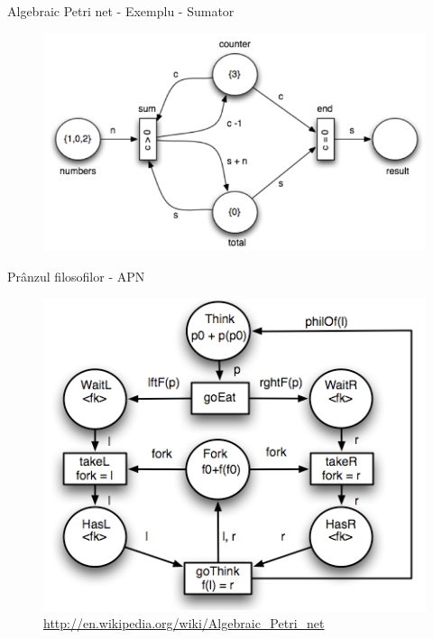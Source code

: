 \documentclass{beamer}
\begin{document}
\begin{frame}{Algebraic Petri net - Exemplu - Sumator}
\begin{figure}
\includegraphics[scale=0.7]{images/sum}
\caption{\label{fig:sum}}
\end{figure}
\end{frame}



\begin{frame}{Prânzul filosofilor - APN}
\begin{figure}
\includegraphics[scale=0.5]{images/apn_filo}
\caption{\label{fig:apn_filo}\url{http://en.wikipedia.org/wiki/Algebraic_Petri_net}}
\end{figure}
\end{frame}
\end{document}
